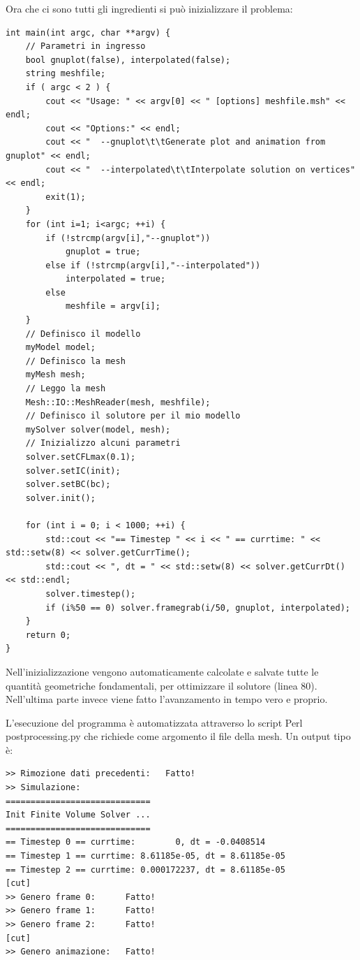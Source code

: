 Ora che ci sono tutti gli ingredienti si può inizializzare il problema:
\begin{lstlisting}[name=dambreak2d]
int main(int argc, char **argv) {
    // Parametri in ingresso
    bool gnuplot(false), interpolated(false);
    string meshfile;
    if ( argc < 2 ) {
        cout << "Usage: " << argv[0] << " [options] meshfile.msh" << endl;
        cout << "Options:" << endl;
        cout << "  --gnuplot\t\tGenerate plot and animation from gnuplot" << endl;
        cout << "  --interpolated\t\tInterpolate solution on vertices" << endl;
        exit(1);
    }
    for (int i=1; i<argc; ++i) {
        if (!strcmp(argv[i],"--gnuplot")) 
            gnuplot = true;
        else if (!strcmp(argv[i],"--interpolated"))
            interpolated = true;
        else
            meshfile = argv[i];
    }
    // Definisco il modello
    myModel model;
    // Definisco la mesh
    myMesh mesh;
    // Leggo la mesh
    Mesh::IO::MeshReader(mesh, meshfile);
    // Definisco il solutore per il mio modello
    mySolver solver(model, mesh);
    // Inizializzo alcuni parametri
    solver.setCFLmax(0.1);
    solver.setIC(init);
    solver.setBC(bc);
    solver.init();

    for (int i = 0; i < 1000; ++i) {
        std::cout << "== Timestep " << i << " == currtime: " << std::setw(8) << solver.getCurrTime();
        std::cout << ", dt = " << std::setw(8) << solver.getCurrDt() << std::endl;
        solver.timestep();
        if (i%50 == 0) solver.framegrab(i/50, gnuplot, interpolated);
    }
    return 0;
}
\end{lstlisting}
Nell'inizializzazione vengono automaticamente calcolate e salvate tutte le quantità geometriche fondamentali, per ottimizzare il solutore (linea 80). Nell'ultima parte invece viene fatto l'avanzamento in tempo vero e proprio.

L'esecuzione del programma è automatizzata attraverso lo script Perl postprocessing.py che richiede come argomento il file della mesh. 
Un output tipo è: 
\begin{verbatim}
>> Rimozione dati precedenti:   Fatto!
>> Simulazione:
=============================                      
Init Finite Volume Solver ...                      
=============================                      
== Timestep 0 == currtime:        0, dt = -0.0408514
== Timestep 1 == currtime: 8.61185e-05, dt = 8.61185e-05
== Timestep 2 == currtime: 0.000172237, dt = 8.61185e-05
[cut]
>> Genero frame 0:      Fatto!
>> Genero frame 1:      Fatto!
>> Genero frame 2:      Fatto!
[cut]
>> Genero animazione:   Fatto!
\end{verbatim}

